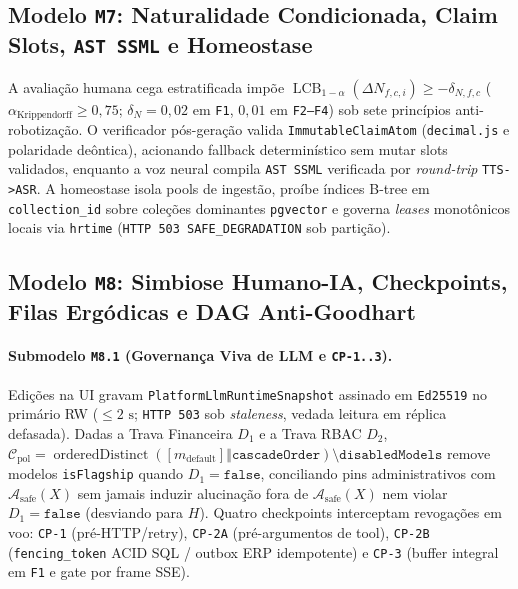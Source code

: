 \documentclass[10pt,twocolumn]{article}
\begin{document}
\subsection{Modelo \texttt{M7}: Naturalidade Condicionada, Claim Slots, \texttt{AST SSML} e Homeostase}

A avalia\c{c}\~ao humana cega estratificada imp\~oe $\operatorname{LCB}_{1-\alpha}(\Delta N_{f,c,i}) \ge -\delta_{N,f,c}$ ($\alpha_{\mathrm{Krippendorff}}\ge 0,75$; $\delta_N=0,02$ em \texttt{F1}, $0,01$ em \texttt{F2--F4}) sob sete princ\'ipios anti-robotiza\c{c}\~ao. O verificador p\'os-gera\c{c}\~ao valida \texttt{ImmutableClaimAtom} (\texttt{decimal.js} e polaridade de\^ontica), acionando fallback determin\'istico sem mutar slots validados, enquanto a voz neural compila \texttt{AST SSML} verificada por \emph{round-trip} \texttt{TTS->ASR}. A homeostase isola pools de ingest\~ao, pro\'ibe \'indices B-tree em \texttt{collection\_id} sobre cole\c{c}\~oes dominantes \texttt{pgvector} e governa \emph{leases} monot\^onicos locais via \texttt{hrtime} (\texttt{HTTP 503 SAFE\_DEGRADATION} sob parti\c{c}\~ao).

\subsection{Modelo \texttt{M8}: Simbiose Humano-IA, Checkpoints, Filas Erg\'odicas e DAG Anti-Goodhart}

\paragraph{Submodelo \texttt{M8.1} (Governan\c{c}a Viva de LLM e \texttt{CP-1..3}).}
Edi\c{c}\~oes na UI gravam \texttt{PlatformLlmRuntimeSnapshot} assinado em \texttt{Ed25519} no prim\'ario RW ($\le 2\text{ s}$; \texttt{HTTP 503} sob \emph{staleness}, vedada leitura em r\'eplica defasada). Dadas a Trava Financeira $D_1$ e a Trava RBAC $D_2$, $\mathcal{C}_{\mathrm{pol}} = \operatorname{orderedDistinct}([m_{\mathrm{default}}] \mathbin{\Vert} \texttt{cascadeOrder}) \setminus \texttt{disabledModels}$ remove modelos \texttt{isFlagship} quando $D_1=\texttt{false}$, conciliando pins administrativos com $\mathcal{A}_{\mathrm{safe}}(X)$ sem jamais induzir alucina\c{c}\~ao fora de $\mathcal{A}_{\mathrm{safe}}(X)$ nem violar $D_1=\texttt{false}$ (desviando para $H$). Quatro checkpoints interceptam revoga\c{c}\~oes em voo: \texttt{CP-1} (pr\'e-HTTP/retry), \texttt{CP-2A} (pr\'e-argumentos de tool), \texttt{CP-2B} (\texttt{fencing\_token} ACID SQL / outbox ERP idempotente) e \texttt{CP-3} (buffer integral em \texttt{F1} e gate por frame SSE).
\end{document}
